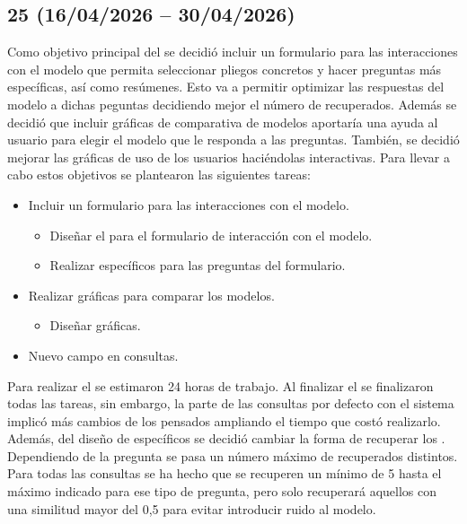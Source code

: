 \subsection{ 25 (16/04/2026 -- 30/04/2026)}
Como objetivo principal del  se decidió incluir un formulario para las interacciones con el modelo que permita seleccionar pliegos concretos y hacer preguntas más específicas, así como resúmenes. Esto va a permitir optimizar las respuestas del modelo a dichas peguntas decidiendo mejor el número de  recuperados. Además se decidió que incluir gráficas de comparativa de modelos aportaría una ayuda al usuario para elegir el modelo que le responda a las preguntas. También, se decidió mejorar las gráficas de uso de los usuarios haciéndolas interactivas. Para llevar a cabo estos objetivos se plantearon las siguientes tareas:

\begin{itemize}
\tightlist
	\item Incluir un formulario para las interacciones con el modelo.
	\begin{itemize}
	\tightlist
			\item Diseñar el  para el formulario de interacción con el modelo.
		\item Realizar  específicos para las preguntas del formulario.
	\end{itemize}
	\item Realizar gráficas para comparar los modelos.
	\begin{itemize}
	\tightlist
		\item Diseñar gráficas.
	\end{itemize}
	\item Nuevo campo en consultas.
\end{itemize}

Para realizar el  se estimaron 24 horas de trabajo. Al finalizar el  se finalizaron todas las tareas, sin embargo, la parte de las consultas por defecto con el sistema implicó más cambios de los pensados ampliando el tiempo que costó realizarlo. Además, del diseño de  específicos se
decidió cambiar la forma de recuperar los . Dependiendo de la pregunta se pasa un número máximo de  recuperados distintos. Para todas las consultas se ha hecho que se recuperen un mínimo de 5  hasta el máximo indicado para ese tipo de pregunta, pero solo recuperará aquellos con una similitud mayor del 0,5 para evitar introducir ruido al modelo. 

